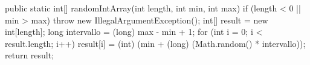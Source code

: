 \begin{unipdcode}[language=Java]
public static int[] randomIntArray(int length, int min, int max) {
    if (length < 0 || min > max)
        throw new IllegalArgumentException();
    int[] result = new int[length];
    long intervallo = (long) max - min + 1;
    for (int i = 0; i < result.length; i++)
        result[i] = (int) (min + (long) (Math.random() * intervallo));
    return result;
}
\end{unipdcode}
